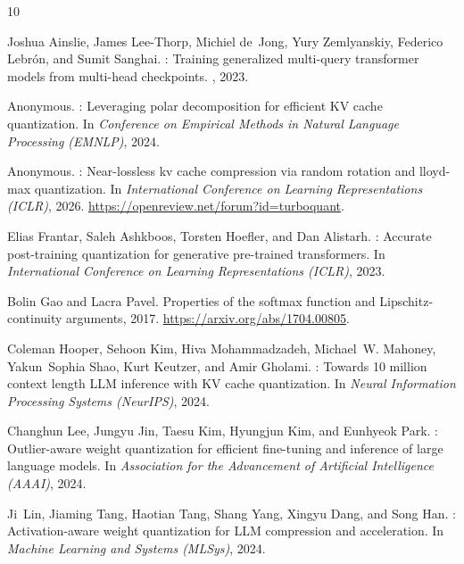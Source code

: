 \documentclass[11pt]{article}
\begin{document}
\begin{thebibliography}{10}

Joshua Ainslie, James Lee-Thorp, Michiel de~Jong, Yury Zemlyanskiy, Federico
  Lebr{\'o}n, and Sumit Sanghai.
: Training generalized multi-query transformer models from
  multi-head checkpoints.
, 2023.

Anonymous.
: Leveraging polar decomposition for efficient {KV} cache
  quantization.
\newblock In {\em Conference on Empirical Methods in Natural Language
  Processing (EMNLP)}, 2024.

Anonymous.
: Near-lossless kv cache compression via random rotation
  and lloyd-max quantization.
\newblock In {\em International Conference on Learning Representations (ICLR)},
  2026.
\newblock \url{https://openreview.net/forum?id=turboquant}.

Elias Frantar, Saleh Ashkboos, Torsten Hoefler, and Dan Alistarh.
: Accurate post-training quantization for generative
  pre-trained transformers.
\newblock In {\em International Conference on Learning Representations (ICLR)},
  2023.

Bolin Gao and Lacra Pavel.
\newblock Properties of the {softmax} function and {Lipschitz}-continuity
  arguments, 2017.
\newblock \url{https://arxiv.org/abs/1704.00805}.

Coleman Hooper, Sehoon Kim, Hiva Mohammadzadeh, Michael~W. Mahoney,
  Yakun~Sophia Shao, Kurt Keutzer, and Amir Gholami.
: Towards 10 million context length {LLM} inference with
  {KV} cache quantization.
\newblock In {\em Neural Information Processing Systems (NeurIPS)}, 2024.

Changhun Lee, Jungyu Jin, Taesu Kim, Hyungjun Kim, and Eunhyeok Park.
: Outlier-aware weight quantization for efficient fine-tuning
  and inference of large language models.
\newblock In {\em Association for the Advancement of Artificial Intelligence
  (AAAI)}, 2024.

Ji~Lin, Jiaming Tang, Haotian Tang, Shang Yang, Xingyu Dang, and Song Han.
: Activation-aware weight quantization for {LLM} compression and
  acceleration.
\newblock In {\em Machine Learning and Systems (MLSys)}, 2024.


\end{thebibliography}
\end{document}
